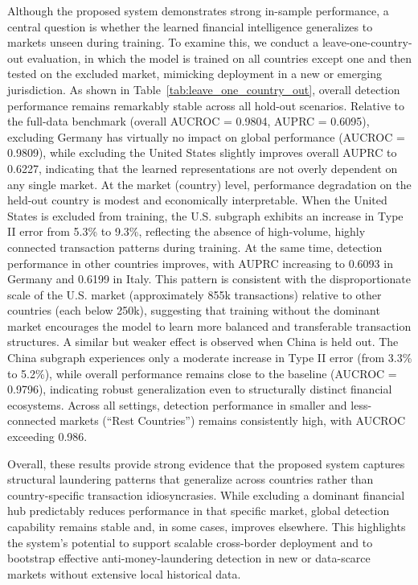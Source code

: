 Although the proposed system demonstrates strong in-sample performance, a central question is whether the learned financial intelligence generalizes to markets unseen during training. To examine this, we conduct a leave-one-country-out evaluation, in which the model is trained on all countries except one and then tested on the excluded market, mimicking deployment in a new or emerging jurisdiction. As shown in Table~\ref{tab:leave_one_country_out}, overall detection performance remains remarkably stable across all hold-out scenarios. Relative to the full-data benchmark (overall AUCROC = 0.9804, AUPRC = 0.6095), excluding Germany has virtually no impact on global performance (AUCROC = 0.9809), while excluding the United States slightly improves overall AUPRC to 0.6227, indicating that the learned representations are not overly dependent on any single market. At the market (country) level, performance degradation on the held-out country is modest and economically interpretable. When the United States is excluded from training, the U.S. subgraph exhibits an increase in Type II error from 5.3\% to 9.3\%, reflecting the absence of high-volume, highly connected transaction patterns during training. At the same time, detection performance in other countries improves, with AUPRC increasing to 0.6093 in Germany and 0.6199 in Italy. This pattern is consistent with the disproportionate scale of the U.S. market (approximately 855k transactions) relative to other countries (each below 250k), suggesting that training without the dominant market encourages the model to learn more balanced and transferable transaction structures. A similar but weaker effect is observed when China is held out. The China subgraph experiences only a moderate increase in Type II error (from 3.3\% to 5.2\%), while overall performance remains close to the baseline (AUCROC = 0.9796), indicating robust generalization even to structurally distinct financial ecosystems. Across all settings, detection performance in smaller and less-connected markets (“Rest Countries”) remains consistently high, with AUCROC exceeding 0.986. 

Overall, these results provide strong evidence that the proposed system captures structural laundering patterns that generalize across countries rather than country-specific transaction idiosyncrasies. While excluding a dominant financial hub predictably reduces performance in that specific market, global detection capability remains stable and, in some cases, improves elsewhere. This highlights the system’s potential to support scalable cross-border deployment and to bootstrap effective anti-money-laundering detection in new or data-scarce markets without extensive local historical data.


